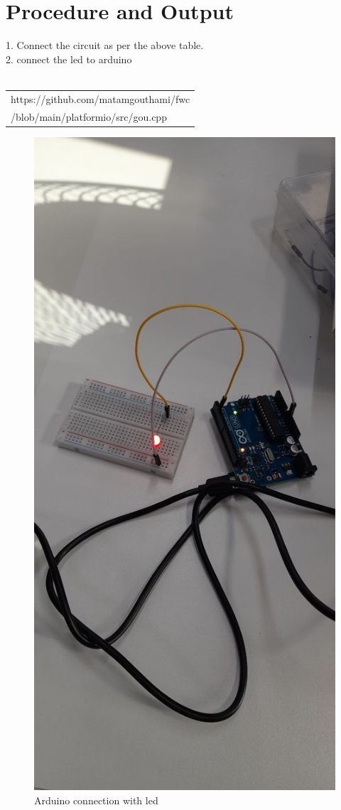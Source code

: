 \documentclass[journal,12pt,twocolumn]{IEEEtran}
\begin{document}
\section{Procedure and Output}
    1. Connect the circuit as per the above table.\\
    2. connect the led to arduino\\
\\ \begin{tabularx}{0.45\textwidth} { 
  | >{\centering\arraybackslash}X |}
  \hline
 https://github.com/matamgouthami/fwc\\/blob/main/platformio/src/gou.cpp\\
  \hline
\end{tabularx}  
\begin{figure}
\centering
\includegraphics[width=\columnwidth]{figs/connection.jpg}
\caption{Arduino connection with led}
\label{fig:connection}
\end{figure}


\end{document}

